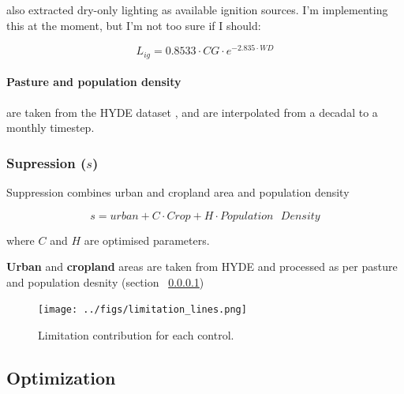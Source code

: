 \begin{shaded}
    \citet{kelley2014improved} also extracted dry-only lighting as available ignition sources. I'm implementing this at the moment, but I'm not too sure if I should:

\begin{equation}
    L_{ig} = 0.8533 \cdot CG \cdot e^{-2.835 \cdot WD}
\end{equation}
\end{shaded}

\paragraph{Pasture and population density}
\label{Pasture}
are taken from the HYDE dataset \citep{klein2007mapping}, and are interpolated from a decadal to a monthly timestep.

\subsubsection{Supression ($s$)}

Suppression combines urban and cropland area and population density

\begin{equation}
    s = urban + C \cdot Crop + H \cdot Population\text{ }Density
    \label{equ:Supression}
\end{equation}

where $C$ and $H$ are optimised parameters.

\textbf{Urban} and \textbf{cropland} areas are taken from HYDE and processed as per pasture and population desnity (section ~\ref{Pasture})


\begin{figure}[!ht]
  \centering
    \texttt{[image: ../figs/limitation\_lines.png]}

  \caption{Limitation contribution for each control.}
  \label{fig:lim_lines}
\end{figure}

\subsection{Optimization}

